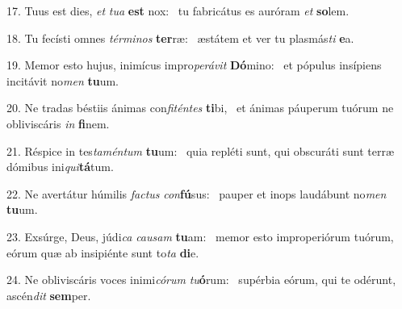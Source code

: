 17. Tuus est dies, \textit{et} \textit{tu}\textit{a} \textbf{est} nox: \ast\  tu fabricátus es auróram \textit{et} \textbf{so}lem.\

18. Tu fecísti omnes \textit{tér}\textit{mi}\textit{nos} \textbf{ter}ræ: \ast\  æstátem et ver tu plasmás\textit{ti} \textbf{e}a.\

19. Memor esto hujus, inimícus impro\textit{pe}\textit{rá}\textit{vit} \textbf{Dó}mino: \ast\  et pópulus insípiens incitávit no\textit{men} \textbf{tu}um.\

20. Ne tradas béstiis ánimas con\textit{fi}\textit{tén}\textit{tes} \textbf{ti}bi, \ast\  et ánimas páuperum tuórum ne obliviscáris \textit{in} \textbf{fi}nem.\

21. Réspice in tes\textit{ta}\textit{mén}\textit{tum} \textbf{tu}um: \ast\  quia repléti sunt, qui obscuráti sunt terræ dómibus ini\textit{qui}\textbf{tá}tum.\

22. Ne avertátur húmilis \textit{fac}\textit{tus} \textit{con}\textbf{fú}sus: \ast\  pauper et inops laudábunt no\textit{men} \textbf{tu}um.\

23. Exsúrge, Deus, júdi\textit{ca} \textit{cau}\textit{sam} \textbf{tu}am: \ast\  memor esto improperiórum tuórum, eórum quæ ab insipiénte sunt to\textit{ta} \textbf{di}e.\

24. Ne obliviscáris voces inimi\textit{có}\textit{rum} \textit{tu}\textbf{ó}rum: \ast\  supérbia eórum, qui te odérunt, ascén\textit{dit} \textbf{sem}per.\


